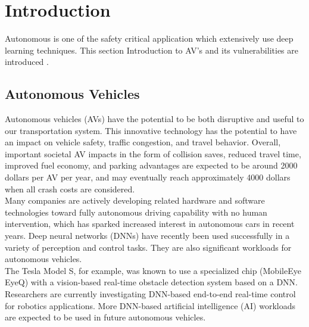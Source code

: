 \documentclass[ 12pt,a4paper,twocolumn,fleqn]{article}
\begin{document}
\fancyhf{}
\pagestyle{fancy}
\fancyfoot[LE,RO]{\thepage}
\renewcommand{\footrulewidth}{0.4pt}%
\newpage
   \pagestyle{fancy}
\setcounter{page}{1}
\section{Introduction}
Autonomous is one of the safety critical application which extensively use deep learning techniques. This section Introduction to AV's and its vulnerabilities are introduced . 
\subsection{Autonomous Vehicles}
Autonomous vehicles (AVs) have the potential to be both disruptive and useful to our transportation system. This innovative technology has the potential to have an impact on vehicle safety, traffic congestion, and travel behavior. Overall, important societal AV impacts in the form of collision saves, reduced travel time, improved fuel economy, and parking advantages are expected to be around 2000 dollars per AV per year, and may eventually reach approximately 4000 dollars when all crash costs are considered.\\
%
Many companies are actively developing related hardware and software technologies toward fully autonomous driving capability with no human intervention, which has sparked increased interest in autonomous cars in recent years. Deep neural networks (DNNs) have recently been used successfully in a variety of perception and control tasks. They are also significant workloads for autonomous vehicles.\\
%
The Tesla Model S, for example, was known to use a specialized chip (MobileEye EyeQ) with a vision-based real-time obstacle detection system based on a DNN. Researchers are currently investigating DNN-based end-to-end real-time control for robotics applications. More DNN-based artificial intelligence (AI) workloads are expected to be used in future autonomous vehicles.\\
\end{document}

